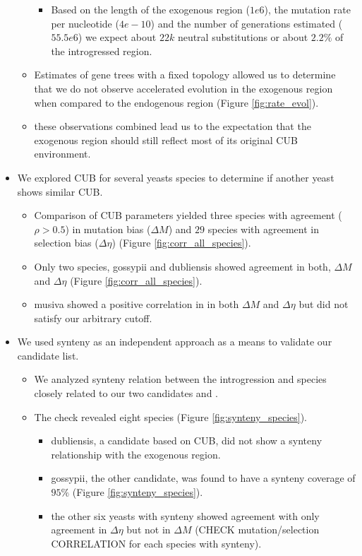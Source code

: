 \documentclass[12pt]{article}
\begin{document}
\begin{itemize}
\begin{itemize}
\begin{itemize}
			\item Based on the length of the exogenous region ($1e6$), the mutation rate per nucleotide ($4e-10$) and the number of generations estimated ($55.5e6$) we expect about $22k$ neutral substitutions or about $2.2 \%$ of the introgressed region.
		\end{itemize}
		\item Estimates of gene trees with a fixed topology allowed us to determine that we do not observe accelerated evolution in the exogenous region when compared to the endogenous region (Figure \ref{fig:rate_evol}).
		\item these observations combined lead us to the expectation that the exogenous region should still reflect most of its original CUB environment.
	\end{itemize}
	\item We explored CUB for several yeasts species to determine if another yeast shows similar CUB.
	\begin{itemize}
		\item Comparison of CUB parameters yielded three species with agreement ($\rho > 0.5$) in mutation bias ($\Delta M$) and $29$ species with agreement in selection bias ($\Delta \eta$) (Figure \ref{fig:corr_all_species}).
		\item Only two species, gossypii and dubliensis showed agreement in both, $\Delta M$ and $\Delta \eta$ (Figure \ref{fig:corr_all_species}).
		\item musiva showed a positive correlation in in both $\Delta M$ and $\Delta \eta$ but did not satisfy our arbitrary cutoff.
	\end{itemize}
	\item We used synteny as an independent approach as a means to validate our candidate list.
	\begin{itemize}
	\item We analyzed synteny relation between the introgression and species closely related to our two candidates and \kluyveri.
	\item The check revealed eight species (Figure \ref{fig:synteny_species}).
		\begin{itemize}
			\item dubliensis, a candidate based on CUB, did not show a synteny relationship with the exogenous region.
			\item gossypii, the other candidate, was found to have a synteny coverage of $95 \%$ (Figure \ref{fig:synteny_species}).
			\item the other six yeasts with synteny showed agreement with only agreement in $\Delta \eta$ but not in $\Delta M$ (CHECK mutation/selection CORRELATION for each species with synteny).

\end{itemize}
\end{itemize}
\end{itemize}
\end{document}
